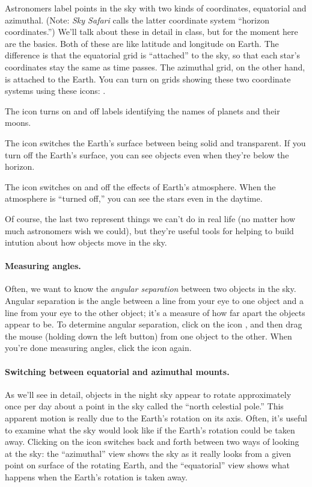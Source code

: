 Astronomers label points in the sky with two kinds of coordinates, equatorial
and azimuthal. (Note: \textit{Sky Safari} calls the latter
coordinate system ``horizon coordinates.'') 
We'll talk about these in detail in class,
but for the moment here are the basics.
Both of these are like latitude and longitude on Earth. The
difference is that the equatorial grid is ``attached'' to the sky, so
that each star's coordinates stay the same as time passes. The azimuthal 
grid, on the other hand, 
is attached to the Earth. You can turn on grids showing these two coordinate systems
using these icons: .

The  icon turns on and off labels identifying the names of 
planets
and their moons.

The  icon switches the Earth's surface between being
solid and transparent. If you turn off the Earth's surface, you can
see objects even when they're below the horizon. 

The  icon switches on and off the effects of 
Earth's atmosphere. When the atmosphere is ``turned off,'' you
can see the stars even in the daytime.

Of course, the last two represent things we can't do in real life
(no matter how much astronomers wish we could), but they're
useful tools for helping to build intution about how
objects move in the sky.

\paragraph{Measuring angles.}
Often, we want to know the \textit{angular separation} between two
objects in the sky. Angular separation is the angle between a line from your eye
to one object and a line from your eye to the other object; it's a measure
of how far apart the objects appear to be. To determine
angular separation, click on the icon , and then drag
the mouse (holding down the left button) from one object to the other.
When you're done measuring angles, click the  icon again.

\paragraph{Switching between equatorial and azimuthal mounts.}
As we'll see in detail, objects in the night sky appear to rotate
approximately once per day about a point in the sky called the ``north
celestial pole.'' This apparent motion is really due to the 
Earth's rotation on its axis. 
Often, it's useful to examine what the sky would look like if
the Earth's rotation could be taken away. Clicking on the 
 icon switches back and forth between two ways of looking
at the sky: the ``azimuthal'' view shows  the sky as it really looks from 
a given point on surface of the rotating Earth, and the ``equatorial''
view shows
what happens when the Earth's rotation is taken away.

